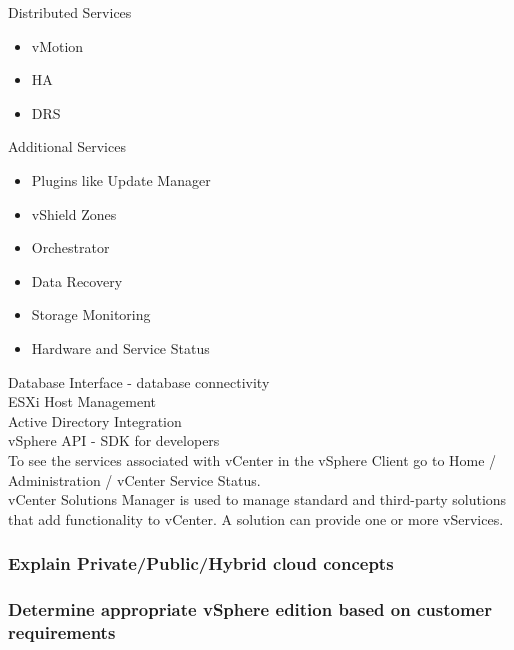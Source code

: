 Distributed Services

\begin{itemize}
\item vMotion
\item HA
\item DRS
\end{itemize}

Additional Services

\begin{itemize}
\item Plugins like Update Manager
\item vShield Zones
\item Orchestrator
\item Data Recovery
\item Storage Monitoring
\item Hardware and Service Status
\end{itemize}

Database Interface - database connectivity\\

ESXi Host Management\\

Active Directory Integration\\

vSphere API - SDK for developers\\

To see the services associated with vCenter in the vSphere Client go to
Home / Administration / vCenter Service Status.\\

vCenter Solutions Manager is used to manage standard and third-party solutions
that add functionality to vCenter. A solution can provide one or more
vServices.

\subsubsection{Explain Private/Public/Hybrid cloud concepts}

\subsubsection{Determine appropriate vSphere edition based on customer requirements}
